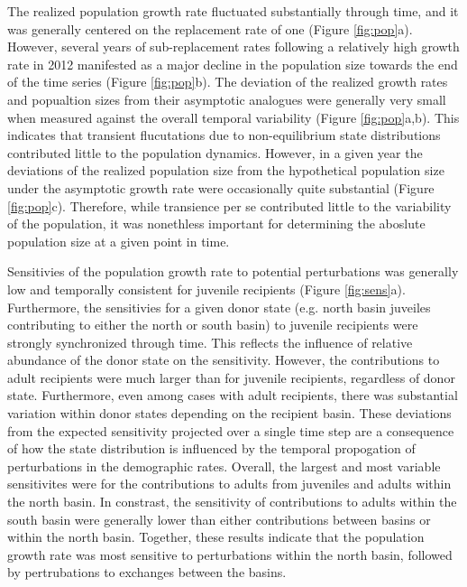 The realized population growth rate fluctuated substantially through time, 
and it was generally centered on the replacement rate of one (Figure \ref{fig:pop}a).
However, 
several years of sub-replacement rates following a relatively high growth rate in 2012
manifested as a major decline in the population size towards the end of the time series
(Figure \ref{fig:pop}b).
The deviation of the realized growth rates and popualtion sizes from their
asymptotic analogues were generally very small 
when measured against the overall temporal variability (Figure \ref{fig:pop}a,b).
This indicates that transient flucutations due to non-equilibrium state distributions
contributed little to the population dynamics. 
However, in a given year 
the deviations of the realized population size from the hypothetical population size 
under the asymptotic growth rate 
were occasionally quite substantial (Figure \ref{fig:pop}c). 
Therefore, while transience per se contributed little to the variability of the population,
it was nonethless important for determining 
the aboslute population size at a given point in time.

Sensitivies of the population growth rate to potential perturbations 
was generally low and temporally consistent for juvenile recipients 
(Figure \ref{fig:sens}a).
Furthermore, 
the sensitivies for a given donor state
(e.g. north basin juveiles contributing to either the north or south basin)
to juvenile recipients were strongly synchronized through time. 
This reflects the influence of relative abundance of the donor state on the sensitivity.
However, the contributions to adult recipients were much larger than for juvenile recipients,
regardless of donor state.
Furthermore, even among cases with adult recipients, there was substantial variation 
within donor states depending on the recipient basin. 
These deviations from the expected sensitivity projected over a single time step
are a consequence of how the state distribution is influenced by 
the temporal propogation of perturbations in the demographic rates.
Overall, the largest and most variable sensitivites were for 
the contributions to adults from juveniles and adults within the north basin.
In constrast, 
the sensitivity of contributions to adults within the south basin were
generally lower than either contributions between basins or within the north basin.
Together, these results indicate that the population growth rate was most sensitive
to perturbations within the north basin, followed by pertrubations to exchanges 
between the basins.

